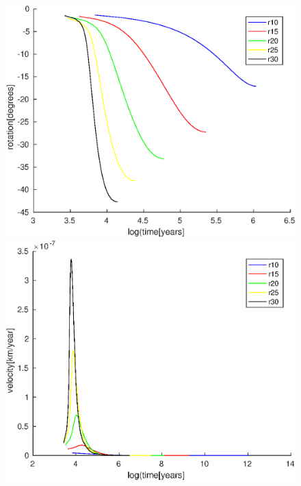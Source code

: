 \documentclass[12pt]{scrreprt}
\begin{document}
\begin{figure}[ht!]
	\begin{minipage}[t]{1.0\textwidth}
		\begin{minipage}[t]{0.5\textwidth}
		\includegraphics[width=1.0\textwidth]{./Snapshots/slab45s1e8mixedr_rot.eps}
		\end{minipage}
		\begin{minipage}[t]{0.5\textwidth}
		\includegraphics[width=1.0\textwidth]{./Snapshots/slab45s1e8mixedr_vel.eps}
		\end{minipage}
	\end{minipage}

\end{figure}
\end{document}
